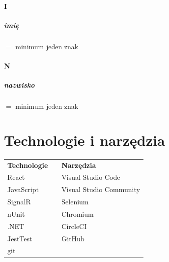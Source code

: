 \documentclass[12pt]{report}
\begin{document}
		\subsubsection{I}
		\paragraph{imię}  $=$ minimum jeden znak  
		\subsubsection{N}
		\paragraph{nazwisko} $=$ minimum jeden znak 


\chapter{Technologie i narzędzia}

	\begin{center}
		\begin{table}[h]
			\def\arraystretch{1.3}
			\begin{tabular}{lll}
				
				\textbf{Technologie} & \hspace{20mm} & \textbf{Narzędzia}      \\
				React                &  & Visual Studio Code      \\
				JavaScript           &  & Visual Studio Community \\
				SignalR              &  & Selenium                \\
				nUnit                &  & Chromium                \\
				.NET                 &  & CircleCI                \\
				JestTest             &  & GitHub                  \\
				git                  &  &                        
			\end{tabular}
		\end{table}
\end{center}
	
	
\end{document}
